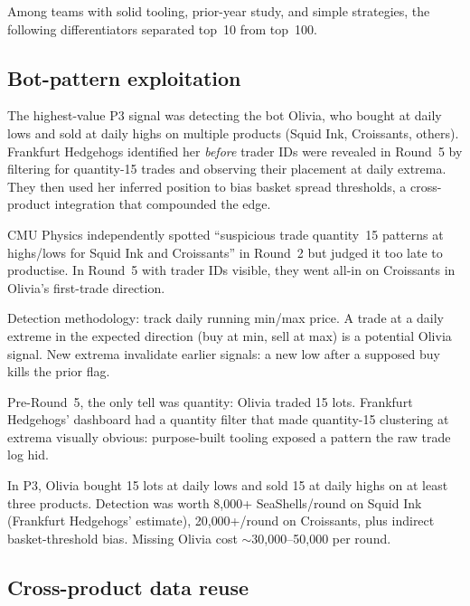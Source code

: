 Among teams with solid tooling, prior-year study, and simple
strategies, the following differentiators separated top~10 from
top~100.

\subsection{Bot-pattern exploitation}
\label{sec:bot_patterns}

The highest-value P3 signal was detecting the bot Olivia, who
bought at daily lows and sold at daily highs on multiple products
(Squid Ink, Croissants, others).  Frankfurt Hedgehogs identified
her \emph{before} trader IDs were revealed in Round~5 by filtering
for quantity-15 trades and observing their placement at daily
extrema.  They then used her inferred position to bias basket
spread thresholds, a cross-product integration that compounded the
edge.

CMU Physics independently spotted ``suspicious trade quantity~15
patterns at highs/lows for Squid Ink and Croissants'' in Round~2
but judged it too late to productise.  In Round~5 with trader IDs
visible, they went all-in on Croissants in Olivia's first-trade
direction.

Detection methodology: track daily running min/max price.  A
trade at a daily extreme in the expected direction (buy at min,
sell at max) is a potential Olivia signal.  New extrema
invalidate earlier signals: a new low after a supposed buy kills
the prior flag.

Pre-Round~5, the only tell was quantity: Olivia traded 15 lots.
Frankfurt Hedgehogs' dashboard had a quantity filter that made
quantity-15 clustering at extrema visually obvious: purpose-built
tooling exposed a pattern the raw trade log hid.

\begin{keyfactbox}
In P3, Olivia bought 15 lots at daily lows and sold 15 at daily
highs on at least three products.  Detection was worth 8{,}000+
SeaShells/round on Squid Ink (Frankfurt Hedgehogs' estimate),
20{,}000+/round on Croissants, plus indirect basket-threshold
bias.  Missing Olivia cost $\sim$30{,}000--50{,}000 per round.
\end{keyfactbox}

\subsection{Cross-product data reuse}
\label{sec:cross_product}

